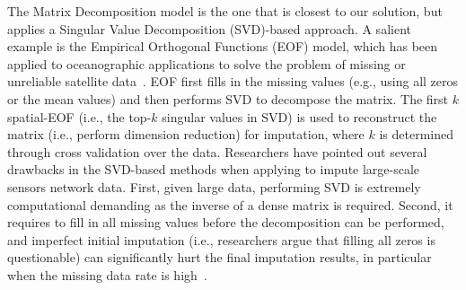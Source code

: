 The Matrix Decomposition model is the one that is closest to our
solution, but applies a Singular Value Decomposition (SVD)-based
approach.  A salient example is the Empirical Orthogonal Functions
(EOF) model, which has been applied to oceanographic applications to
solve the problem of missing or unreliable satellite
data~\cite{beckers2003eof}.  EOF first fills in the missing values
(e.g., using all zeros or the mean values) and then performs SVD to
decompose the matrix. The first $k$ spatial-EOF (i.e., the top-$k$
singular values in SVD) is used to reconstruct the matrix (i.e.,
perform dimension reduction) for imputation, where $k$ is determined
through cross validation over the data.  Researchers have pointed out
several drawbacks in the SVD-based methods when applying to impute
large-scale sensors network data. First, given large data, performing
SVD is extremely computational demanding as the inverse of a dense
matrix is required. Second, it requires to fill in all missing values
before the decomposition can be performed, and imperfect initial
imputation (i.e., researchers argue that filling all zeros is
questionable) can significantly hurt the final imputation results, in
particular when the missing data rate is
high~\cite{koren2009matrix,ke2005robust}.

  
